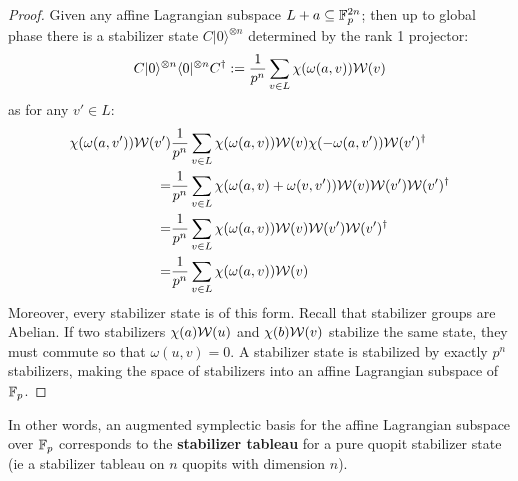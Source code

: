 \begin{proof}
Given any affine Lagrangian subspace $L+a\subseteq \mathbb{F}_p^{2n}$; then up to global phase there is a stabilizer state $C | 0\rangle^{\otimes n}$ determined by the rank 1 projector:
$$
C | 0\rangle^{\otimes n} \langle 0| ^{\otimes n}C^{\dag}:=\dfrac{1}{p^n}\sum_{v \in L}\chi(\omega(a,v)) {\cal W}(v)
$$
as for any $v' \in L$:
\begin{align*}
\chi(\omega(a,v')) {\cal W}(v') &\dfrac{1}{p^n}\sum_{v \in L}\chi(\omega(a,v)) {\cal W}(v) \chi(-\omega(a,v')) {\cal W}(v')^\dag\\
=&
 \dfrac{1}{p^n}\sum_{v \in L}\chi(\omega(a,v)+\omega(v,v')) {\cal W}(v)
{\cal W}(v') {\cal W}(v')^\dag\\
=&
 \dfrac{1}{p^n}\sum_{v \in L}\chi(\omega(a,v) ){\cal W}(v)
{\cal W}(v') {\cal W}(v')^\dag\\
=&
 \dfrac{1}{p^n}\sum_{v \in L}\chi(\omega(a,v)) {\cal W}(v)
\end{align*}
Moreover, every stabilizer state is of this form.  Recall that stabilizer groups are Abelian.
If two stabilizers $\chi(a){\cal W}(u)$ and $\chi(b){\cal W}(v)$ stabilize the same state, they must commute so that $\omega(u,v)=0$.
A stabilizer state is stabilized by exactly $p^n$ stabilizers,  making the space of stabilizers into an affine Lagrangian subspace of $\mathbb{F}_p$. 
\end{proof}\begingroup
In other words, an augmented symplectic basis for the affine Lagrangian subspace over $\mathbb{F}_p$ corresponds to the {\bf stabilizer tableau} for a pure quopit stabilizer state (ie a stabilizer tableau on $n$ quopits with dimension $n$).

